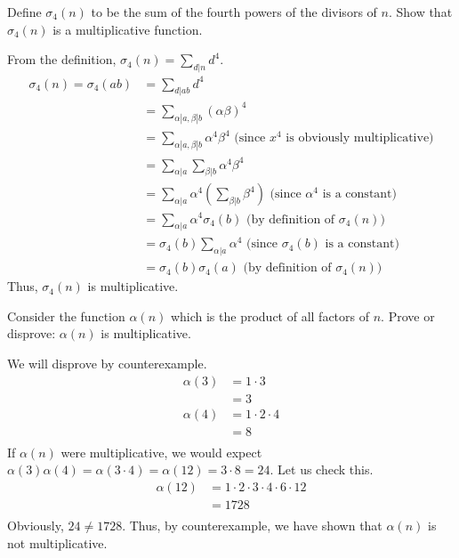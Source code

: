 \documentclass{article}
\begin{document}
\begin{problem}{}{}
    Define $\sigma_4(n)$ to be the sum of the fourth powers of the divisors of $n$. Show that $\sigma_4(n)$ is a multiplicative function.
\end{problem}
\begin{solution}{}{}
    From the definition, $\sigma_4(n)=\sum_{d|n}d^4$.
    \begin{align*}
        \sigma_4(n)=\sigma_4(ab)&=\sum_{d|ab}d^4 \\
        &=\sum_{\alpha|a,\beta|b}(\alpha\beta)^4\\
        &=\sum_{\alpha|a,\beta|b}\alpha^4\beta^4 \text{ (since $x^4$ is obviously multiplicative)} \\
        &=\sum_{\alpha|a}\sum_{\beta|b}\alpha^4\beta^4 \\
        &=\sum_{\alpha|a}\alpha^4(\sum_{\beta|b}\beta^4) \text{ (since $\alpha^4$ is a constant)} \\
        &=\sum_{\alpha|a}\alpha^4\sigma_4(b) \text{ (by definition of $\sigma_4(n)$)} \\
        &=\sigma_4(b)\sum_{\alpha|a}\alpha^4 \text{ (since $\sigma_4(b)$ is a constant)} \\
        &=\sigma_4(b)\sigma_4(a) \text{ (by definition of $\sigma_4(n)$)}
    \end{align*}
    Thus, $\sigma_4(n)$ is multiplicative.
\end{solution}

\begin{problem}{}{}
    Consider the function $\alpha(n)$ which is the product of all factors of $n$. Prove or disprove: $\alpha(n)$ is multiplicative.
\end{problem}
\begin{solution}{}{}
    We will disprove by counterexample.
    \begin{align*}
        \alpha(3)&=1\cdot3 \\
        &=3 \\
        \alpha(4)&=1\cdot2\cdot4 \\
        &=8 \\
    \end{align*}
    If $\alpha(n)$ were multiplicative, we would expect $\alpha(3)\alpha(4)=\alpha(3\cdot4)=\alpha(12)=3\cdot8=24$. Let us check this.
    \begin{align*}
        \alpha(12)&=1\cdot2\cdot3\cdot4\cdot6\cdot12 \\
        &=1728 \\
    \end{align*}
    Obviously, $24\neq1728$. Thus, by counterexample, we have shown that $\alpha(n)$ is not multiplicative.
\end{solution}
\end{document}
